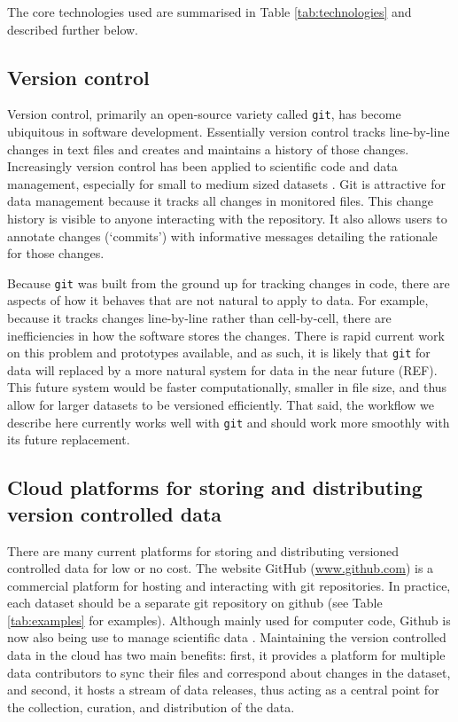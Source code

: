 \documentclass[a4paper,11pt]{article}
\newcommand{\smurl}[1]{{\footnotesize\url{#1}}}
\begin{document}
The core technologies used are summarised in Table \ref{tab:technologies} and described further below.

\subsection{Version control}

Version control, primarily an open-source variety called \texttt{git}, has become ubiquitous in software development.  Essentially version control tracks line-by-line changes in text files and creates and maintains a history of those changes. Increasingly version control has been applied to scientific code and data management, especially for small to medium sized datasets \citep{Ram-2013, Perkel-2016}. Git is attractive for data management because it tracks all changes in monitored files. This change history is visible to anyone interacting with the repository. It also allows users to annotate changes (`commits') with informative messages detailing the rationale for those changes.
  
Because \texttt{git} was built from the ground up for tracking changes in code, there are aspects of how it behaves that are not natural to apply to  data.  For example, because it tracks changes line-by-line rather than cell-by-cell, there are inefficiencies in how the software stores the changes.  There is rapid current work on this problem and prototypes available, and as such, it is likely that \texttt{git} for data will replaced by a more natural system for data in the near future (REF).  This future system would be faster computationally, smaller in file size, and thus allow for larger datasets to be versioned efficiently.  That said, the workflow we describe here currently works well with \texttt{git} and should work more smoothly with its future replacement.  

\subsection{Cloud platforms for storing and distributing version controlled data}

There are many current platforms for storing and distributing versioned controlled data for low or no cost.  The website GitHub (\smurl{www.github.com}) is a commercial platform for hosting and interacting with git repositories. In practice, each dataset should be a separate git repository on github (see Table \ref{tab:examples} for examples). Although mainly used for computer code, Github is now also being use to manage scientific data \citep{Perkel-2016}. Maintaining the version controlled data in the cloud has two main benefits: first, it provides a platform for multiple data contributors to sync their files and correspond about changes in the dataset, and second, it hosts a stream of data releases, thus acting as a central point for  the collection, curation, and distribution of the data.
\end{document}
